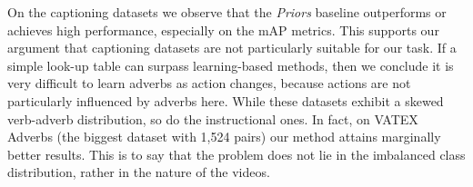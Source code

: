\documentclass[10pt,twocolumn,letterpaper]{article}
\begin{document}
On the captioning datasets we observe that the \textit{Priors} baseline outperforms or achieves high performance, especially on the mAP metrics. 
This supports our argument that captioning datasets are not particularly suitable for our task. 
If a simple look-up table can surpass learning-based methods, then we conclude it is very difficult to learn adverbs as action changes, 
because actions are not particularly influenced by adverbs here. While these datasets exhibit a skewed verb-adverb distribution, so do the instructional ones. In fact, on VATEX Adverbs (the biggest dataset with 1,524 pairs) our method attains marginally better results. This is to say that the problem does not lie in the imbalanced class distribution, rather in the 
nature of the videos. 

\begin{table*}[t]
\centering
{}
\end{table*}
\end{document}
